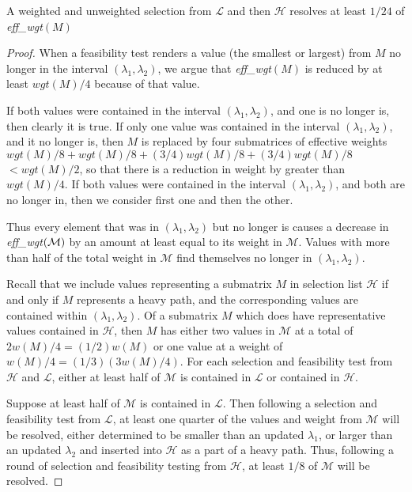 \documentclass[12pt]{article}
\begin{document}
\begin{spacing}{1.5}
\begin{lemma}
A weighted and unweighted selection from $\mathcal{L}$ and then $\mathcal{H}$ resolves at least $1/24$ of {\it eff\_wgt}$(M)$
\end{lemma}
\begin{proof}
When a feasibility test renders a value (the smallest or largest)
from $M$ no longer in the interval $(\lambda_1, \lambda_2)$,
we argue that {\it eff\_wgt}$(M)$ is reduced by at least $wgt(M)/4$
because of that value.

If both values were contained in the interval $(\lambda_1, \lambda_2)$,
and one is no longer is, then clearly it is true.
If only one value was contained in the interval $(\lambda_1, \lambda_2)$,
and it no longer is,
then $M$ is replaced by four submatrices of effective weights
$wgt(M)/8 + wgt(M)/8 + (3/4)wgt(M)/8 + (3/4)wgt(M)/8$ $< wgt(M)/2$,
so that there is a reduction in weight by greater than $wgt(M)/4$.
If both values were contained in the interval $(\lambda_1, \lambda_2)$,
and both are no longer in,
then we consider first one and then the other.

Thus every element that was in $(\lambda_1, \lambda_2)$ but no longer is
causes a decrease in {\it eff\_wgt}$(\cal M )$ by an amount
at least equal to its weight in $\mathcal{M}$.
Values with more than half of the total weight in $\mathcal{M}$
find themselves no longer in $(\lambda_1, \lambda_2)$.

Recall that we include values representing a submatrix $M$ in selection list $\mathcal{H}$ if and only if 
$M$ represents a heavy path, and the corresponding values are contained within $(\lambda_1, \lambda_2)$. 
Of a submatrix $M$ which does have representative values contained in $\mathcal{H}$, 
then $M$ has either two values in $\mathcal{M}$ 
at a total of $2w(M)/4 = (1/2)w(M)$ 
or one value at a weight of $w(M)/4 = (1/3)(3w(M)/4)$. 
For each selection and feasibility test from $\mathcal{H}$ and $\mathcal{L}$, either 
at least half of $\mathcal{M}$ is contained in $\mathcal{L}$ or contained in $\mathcal{H}$. 

Suppose at least half of $\mathcal{M}$ is contained in $\mathcal{L}$. 
Then following a selection and feasibility test from $\mathcal{L}$, at least one quarter of the 
values and weight from $\mathcal{M}$ will be resolved, either determined to be smaller than an updated $\lambda_1$, 
or larger than an updated $\lambda_2$ and inserted into $\mathcal{H}$ as a part of a heavy path. 
Thus, following a round of selection and feasibility testing from $\mathcal{H}$, at least $1/8$ of $\mathcal{M}$ will be resolved.


\end{proof}
\end{spacing}
\end{document}

